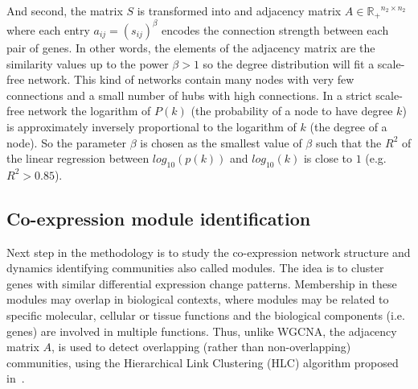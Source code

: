 \documentclass[12pt,journal, onecolumn]{IEEEtran}
\begin{document}
And second, the matrix $S$ is transformed into and adjacency matrix $A \in \mathbb{R_+}^{n_2\times n_2}$ where each entry $a_{ij} = (s_{ij})^\beta $ encodes the connection strength between each pair of genes. In other words, the elements of the adjacency matrix are the similarity values up to the power $\beta > 1$ so the degree distribution will fit a scale-free network. This kind of networks contain many nodes with very few connections and a small number of hubs with high connections. In a strict scale-free network the logarithm of $P(k)$ (the probability of a node to have degree $k$) is approximately inversely proportional to the logarithm of $k$ (the degree of a node). So the parameter $\beta$ is chosen as the smallest value of $\beta$ such that the $R^2$ of the linear regression between $log_{10}(p(k))$ and $log_{10}(k)$ is close to $1$ (e.g. $R^2 > 0.85$). \\



\subsection{Co-expression module identification}

Next step in the methodology is to study the co-expression network structure and dynamics identifying communities also called modules. The idea is to cluster genes with similar differential expression change patterns. Membership in these modules may overlap in biological contexts, where modules may be related to specific molecular, cellular or tissue functions and the biological components (i.e. genes) are involved in multiple functions. Thus, unlike WGCNA, the adjacency matrix $A$, is used to detect overlapping (rather than non-overlapping) communities, using the Hierarchical Link Clustering (HLC) algorithm proposed in~\cite{ahn2010link}.\\
\end{document}
